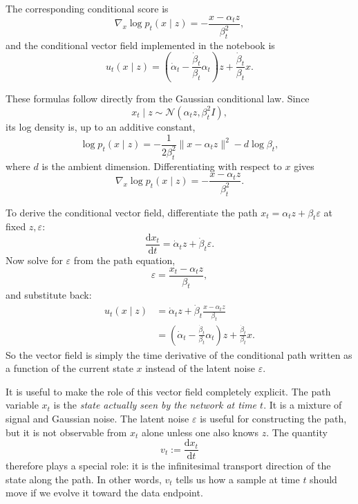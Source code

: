 \documentclass[11pt]{article}
\newcommand{\e}{\varepsilon}
\newcommand{\dd}{\mathrm{d}}
\newcommand{\grad}{\nabla}
\begin{document}
The corresponding conditional score is
\begin{equation}
  \grad_x \log p_t(x\mid z)
  =
  -\frac{x-\alpha_t z}{\beta_t^2},
\end{equation}
and the conditional vector field implemented in the notebook is
\begin{equation}
  u_t(x\mid z)
  =
  \left(\dot\alpha_t - \frac{\dot\beta_t}{\beta_t}\alpha_t \right)z
  +
  \frac{\dot\beta_t}{\beta_t} x.
\end{equation}

These formulas follow directly from the Gaussian conditional law. Since
\begin{equation}
  x_t\mid z \sim \mathcal N(\alpha_t z,\beta_t^2 I),
\end{equation}
its log density is, up to an additive constant,
\begin{equation}
  \log p_t(x\mid z)
  =
  -\frac{1}{2\beta_t^2}\|x-\alpha_t z\|^2
  - d\log\beta_t,
\end{equation}
where \(d\) is the ambient dimension. Differentiating with respect to \(x\) gives
\begin{equation}
  \grad_x \log p_t(x\mid z)
  =
  -\frac{x-\alpha_t z}{\beta_t^2}.
\end{equation}

To derive the conditional vector field, differentiate the path \(x_t=\alpha_t z+\beta_t\e\) at fixed \(z,\e\):
\begin{equation}
  \frac{\dd x_t}{\dd t}
  =
  \dot\alpha_t z + \dot\beta_t \e.
\end{equation}
Now solve for \(\e\) from the path equation,
\begin{equation}
  \e = \frac{x_t-\alpha_t z}{\beta_t},
\end{equation}
and substitute back:
\begin{align}
  u_t(x\mid z)
  &= \dot\alpha_t z + \dot\beta_t \frac{x-\alpha_t z}{\beta_t} \\
  &= \left(\dot\alpha_t - \frac{\dot\beta_t}{\beta_t}\alpha_t \right)z
   + \frac{\dot\beta_t}{\beta_t}x.
\end{align}
So the vector field is simply the time derivative of the conditional path written as a function of the current state \(x\) instead of the latent noise \(\e\).

It is useful to make the role of this vector field completely explicit. The path variable \(x_t\) is the \emph{state actually seen by the network at time \(t\)}. It is a mixture of signal and Gaussian noise. The latent noise \(\e\) is useful for constructing the path, but it is not observable from \(x_t\) alone unless one also knows \(z\). The quantity
\begin{equation}
  v_t := \frac{\dd x_t}{\dd t}
\end{equation}
therefore plays a special role: it is the infinitesimal transport direction of the state along the path. In other words, \(v_t\) tells us how a sample at time \(t\) should move if we evolve it toward the data endpoint.
\end{document}
